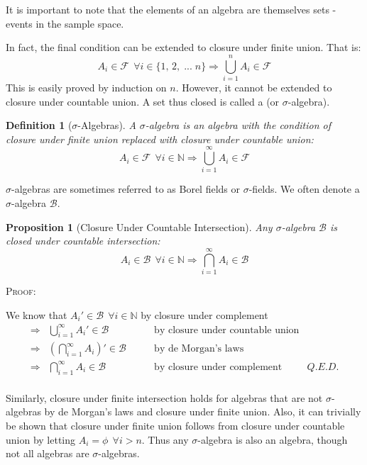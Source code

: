 \documentclass[12pt,a4paper]{article}
\newtheorem{defn}[thm]{Definition}
\newtheorem{prop}[thm]{Proposition}
\newcommand{\uline}[1]{\underline{\smash{#1}}}
\begin{document}
\noindent It is important to note that the elements of an algebra are themselves sets - events in the sample space.\par
\vspace{12pt}

\noindent In fact, the final condition can be extended to closure under finite union. That is:
$$A_i \in\mathcal{F}\:\:\forall i\in\{1,\,2,\;...\;n\}\Rightarrow\bigcup_{i=1}^{n}A_i\in\mathcal{F}$$
This is easily proved by induction on $n$. However, it cannot be extended to closure under countable union. A set thus closed is called a \uline{sigma-algebra} (or $\sigma$-algebra).

\begin{defn}[$\sigma$-Algebras]

A $\sigma$-algebra is an algebra with the condition of closure under finite union replaced with closure under countable union:
$$A_i\in\mathcal{F}\:\:\forall i\in\mathbb{N}\Rightarrow\bigcup_{i=1}^{\infty}A_i\in\mathcal{F}$$\end{defn}

\noindent $\sigma$-algebras are sometimes referred to as Borel fields or $\sigma$-fields. We often denote a $\sigma$-algebra $\mathcal{B}$.

\begin{prop}[Closure Under Countable Intersection]

Any $\sigma$-algebra $\mathcal{B}$ is closed under countable intersection:
$$A_i\in\mathcal{B}\:\:\forall i\in\mathbb{N}\Rightarrow\bigcap_{i=1}^{\infty}A_i\in\mathcal{B}$$\end{prop}

\noindent \textsc{Proof:}\par
\vspace{12pt}
\indent We know that $A_i'\in\mathcal{B}\:\:\forall i\in\mathbb{N}$ by closure under complement
$$\begin{array}{cllr}
\Rightarrow& \bigcup\limits_{i=1}^{\infty}A_i'\in\mathcal{B}\qquad &\text{by closure under countable union}&\\
\Rightarrow& \left(\bigcap\limits_{i=1}^{\infty}A_i\right)'\in\mathcal{B}\qquad &\text{by de Morgan's laws}&\\
\Rightarrow& \bigcap\limits_{i=1}^{\infty}A_i\in\mathcal{B}\qquad &\text{by closure under complement}&Q.E.D.\\
\end{array}$$

Similarly, closure under finite intersection holds for algebras that are not $\sigma$-algebras by de Morgan's laws and closure under finite union. Also, it can trivially be shown that closure under finite union follows from closure under countable union by letting $A_i=\phi\:\:\forall i>n$. Thus any $\sigma$-algebra is also an algebra, though not all algebras are $\sigma$-algebras.
\end{document}

